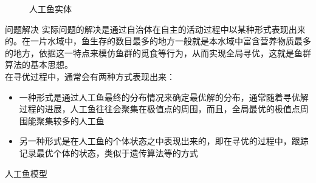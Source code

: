 \documentclass[a4paper, 11pt]{article}
\begin{document}
\begin{section}
\begin{subsection}
\begin{subsubsection}
\begin{figure}[htbp]
			\caption{人工鱼实体}
		\end{figure}
		\end{subsubsection}
		\begin{subsubsection}
			{问题解决}	实际问题的解决是通过自治体在自主的活动过程中以某种形式表现出来的。在一片水域中，鱼生存的数目最多的地方一般就是本水域中富含营养物质最多的地方，依据这一特点来模仿鱼群的觅食等行为，从而实现全局寻优，这就是鱼群算法的基本思想。\\在寻优过程中，通常会有两种方式表现出来：
		\begin{itemize}
			\item{一种形式是通过人工鱼最终的分布情况来确定最优解的分布，通常随着寻优解过程的进展，人工鱼往往会聚集在极值点的周围，而且，全局最优的极值点周围能聚集较多的人工鱼}
			\item{另一种形式是在人工鱼的个体状态之中表现出来的，即在寻优的过程中，跟踪记录最优个体的状态，类似于遗传算法等的方式}
		\end{itemize}
		\end{subsubsection}
	\end{subsection}
	\begin{subsection}
		{人工鱼模型}

\end{subsection}
\end{section}
\end{document}
